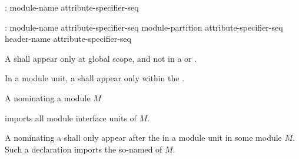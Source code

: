 \begin{std.txt}\color{addclr}
\begin{before}
  \begin{bnf}\color{addclr}
    :\br
       module-name attribute-specifier-seq\opt {} \terminal{;}
  \end{bnf}
\end{before}\begin{after}
  \begin{bnf}\color{addclr}
    :\br
      \opt{}  module-name attribute-specifier-seq\opt {} \terminal{;}\br
      \opt{}  module-partition attribute-specifier-seq\opt {} \terminal{;}\br
      \opt{}  header-name attribute-specifier-seq\opt {} \terminal{;}
  \end{bnf}
\end{after}

  \resetalinea[0]
  \alinea
  A  shall appear only at
  global scope, and not in a 
  or .
  \begin{after}\color{addclr}
  In a module unit, a  shall
  appear only within the .

  \alinea
  \end{after}
  A  nominating a module $M$
  \begin{after}\color{addclr}
  imports all module interface units of $M$.
  \end{after}

  \begin{after}\color{addclr}
  \alinea
  A  nominating
  a  shall only appear after
  the  in a module unit in
  some module $M$.
  Such a declaration imports the so-named
   of $M$.


\end{after}
\end{std.txt}
